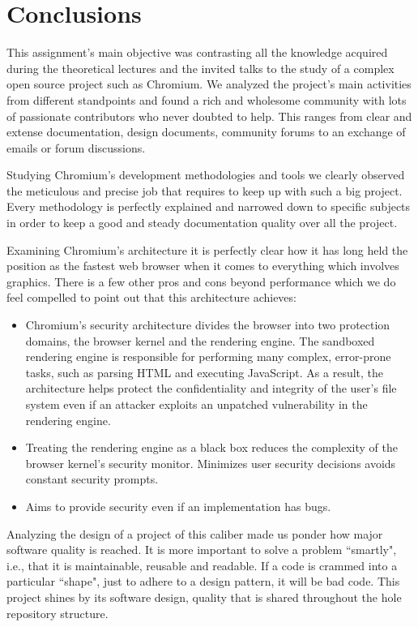 \chapter{Conclusions}
\label{chap:conclusions}

This assignment's main objective was contrasting all the knowledge acquired during the theoretical lectures and the invited talks to the study of a complex open source project such as Chromium. We analyzed the project's main activities from different standpoints and found a rich and wholesome community with lots of passionate contributors who never doubted to help. This ranges from clear and extense documentation, design documents, community forums to an exchange of emails or forum discussions. 

Studying Chromium's development methodologies and tools we clearly observed the meticulous and precise job that requires to keep up with such a big project. Every methodology is perfectly explained and narrowed down to specific subjects in order to keep a good and steady documentation quality over all the project. 

Examining Chromium's architecture it is perfectly clear how it has long held the position as the fastest web browser when it comes to everything which involves graphics. There is a few other pros and cons beyond performance which we do feel compelled to point out that this architecture achieves:
\begin{itemize}
    \item Chromium’s security architecture divides the browser into two protection domains, the browser kernel and the rendering engine. The sandboxed rendering engine is responsible for performing many complex, error-prone tasks, such as parsing HTML and executing JavaScript. As a result, the architecture helps protect the confidentiality and integrity of the user’s file system even if an attacker exploits an unpatched vulnerability in the rendering engine. 
    \item Treating the rendering engine as a black box reduces the complexity of the browser kernel’s security monitor. Minimizes user security decisions avoids constant security prompts.
    \item Aims to provide security even if an implementation has bugs. 
\end{itemize}

Analyzing the design of a project of this caliber made us ponder how major software quality is reached. It is more important to solve a problem ``smartly", i.e., that it is maintainable, reusable and readable. If a code is crammed into a particular ``shape", just to adhere to a design pattern, it will be bad code. This project shines by its software design, quality that is shared throughout the hole repository structure.

